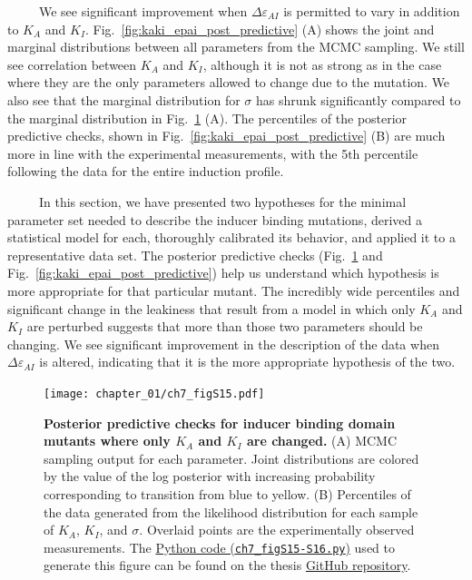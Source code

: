 \documentclass[12pt]{caltech_thesis}
\begin{document}
~~~~~We see significant improvement when \(\Delta\varepsilon_{AI}\) is
permitted to vary in addition to \(K_A\) and \(K_I\).
Fig.~\ref{fig:kaki_epai_post_predictive} (A) shows the joint and
marginal distributions between all parameters from the MCMC sampling. We
still see correlation between \(K_A\) and \(K_I\), although it is not as
strong as in the case where they are the only parameters allowed to
change due to the mutation. We also see that the marginal distribution
for \(\sigma\) has shrunk significantly compared to the marginal
distribution in Fig.~\ref{fig:kaki_post_predictive} (A). The percentiles
of the posterior predictive checks, shown in
Fig.~\ref{fig:kaki_epai_post_predictive} (B) are much more in line with
the experimental measurements, with the 5\(\text{th}\) percentile
following the data for the entire induction profile.

~~~~~In this section, we have presented two hypotheses for the minimal
parameter set needed to describe the inducer binding mutations, derived
a statistical model for each, thoroughly calibrated its behavior, and
applied it to a representative data set. The posterior predictive checks
(Fig.~\ref{fig:kaki_post_predictive} and
Fig.~\ref{fig:kaki_epai_post_predictive}) help us understand which
hypothesis is more appropriate for that particular mutant. The
incredibly wide percentiles and significant change in the leakiness that
result from a model in which only \(K_A\) and \(K_I\) are perturbed
suggests that more than those two parameters should be changing. We see
significant improvement in the description of the data when
\(\Delta\varepsilon_{AI}\) is altered, indicating that it is the more
appropriate hypothesis of the two.

\hypertarget{fig:kaki_post_predictive}{%
\begin{figure}
\centering
\texttt{[image: chapter\_01/ch7\_figS15.pdf]}
\caption[{Posterior predictive checks for inducer binding domain mutants
where only \(K_A\) and \(K_I\) are changed.}]{\textbf{Posterior
predictive checks for inducer binding domain mutants where only \(K_A\)
and \(K_I\) are changed.} (A) MCMC sampling output for each parameter.
Joint distributions are colored by the value of the log posterior with
increasing probability corresponding to transition from blue to yellow.
(B) Percentiles of the data generated from the likelihood distribution
for each sample of \(K_A\), \(K_I\), and \(\sigma\). Overlaid points are
the experimentally observed measurements. The
\href{https://github.com/gchure/phd/blob/master/src/chapter_07/code/ch7_figS15-S16.py}{Python
code (\texttt{ch7\_figS15-S16.py})} used to generate this figure can be
found on the thesis \href{https://github.com/gchure/phd}{GitHub
repository}.}
\label{fig:kaki_post_predictive}
\end{figure}
}
\end{document}
